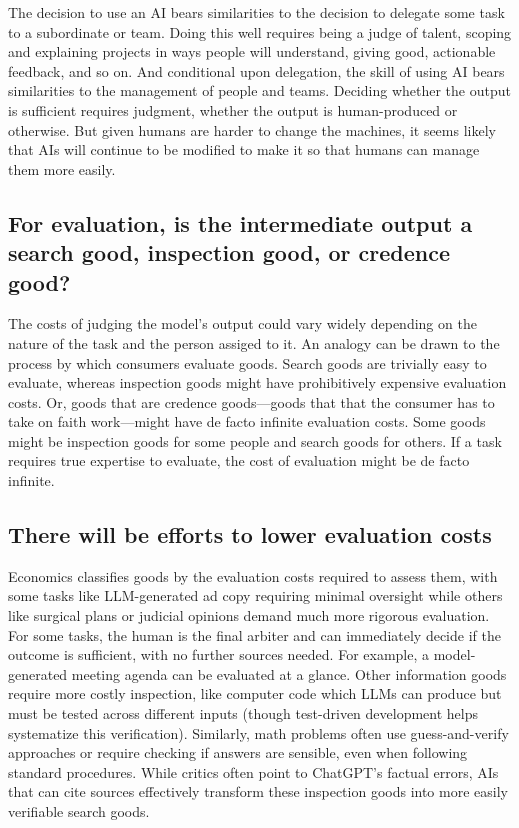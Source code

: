 \documentclass{article}
\begin{document}
The decision to use an AI bears similarities to the decision to delegate some task to a subordinate or team.
Doing this well requires being a judge of talent, scoping and explaining projects in ways people will understand, giving good, actionable feedback, and so on. 
And conditional upon delegation, the skill of using AI bears similarities to the management of people and teams. 
Deciding whether the output is sufficient requires judgment, whether the output is human-produced or otherwise. 
But given humans are harder to change the machines, it seems likely that AIs will continue to be modified to make it so that humans can manage them more easily. 
  
\subsection{For evaluation, is the intermediate output a search good, inspection good, or credence good?}
The costs of judging the model's output could vary widely depending on the nature of the task and the person assiged to it.
An analogy can be drawn to the process by which consumers evaluate goods. 
Search goods are trivially easy to evaluate, whereas inspection goods might have prohibitively expensive evaluation costs. 
Or, goods that are credence goods---goods that that the consumer has to take on faith work---might have de facto infinite evaluation costs.
Some goods might be inspection goods for some people and search goods for others. 
If a task requires true expertise to evaluate, the cost of evaluation might be de facto infinite.
  
\subsection{There will be efforts to lower evaluation costs}
Economics classifies goods by the evaluation costs required to assess them, with some tasks like LLM-generated ad copy requiring minimal oversight while others like surgical plans or judicial opinions demand much more rigorous evaluation.
For some tasks, the human is the final arbiter and can immediately decide if the outcome is sufficient, with no further sources needed. 
For example, a model-generated meeting agenda can be evaluated at a glance. 
Other information goods require more costly inspection, like computer code which LLMs can produce but must be tested across different inputs (though test-driven development helps systematize this verification). 
Similarly, math problems often use guess-and-verify approaches or require checking if answers are sensible, even when following standard procedures. 
While critics often point to ChatGPT's factual errors, AIs that can cite sources effectively transform these inspection goods into more easily verifiable search goods.
  
\end{document}
